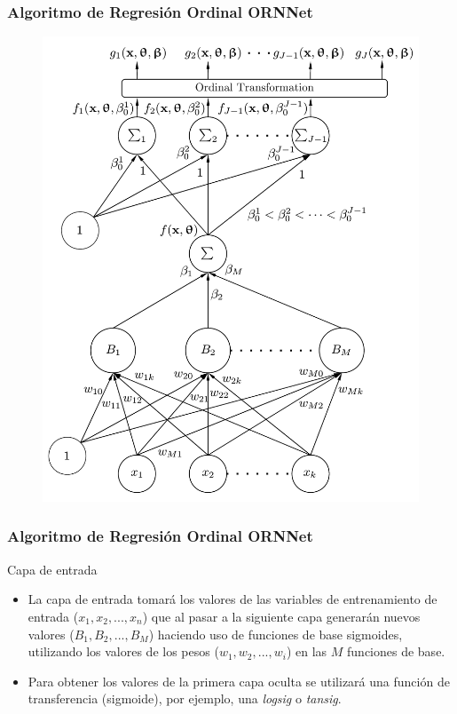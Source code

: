 \documentclass[compress,allowframebreaks]{beamer}
\begin{document}
			\begin{frame}
				\frametitle{\normalsize Algoritmo de Regresión Ordinal ORNNet}
				
				\begin{figure}[h]
					\centering
					\includegraphics[scale=0.3]{img/ORNNet.pdf}
				\end{figure}
			\end{frame}
				
			\begin{frame}
				\frametitle{\normalsize Algoritmo de Regresión Ordinal ORNNet}
				
				\begin{block}{Capa de entrada}
					\begin{itemize}\justifying
						\item La capa de entrada tomará los valores de las variables de entrenamiento de entrada ($x_1, x_2, ..., x_n$) que al pasar a la siguiente capa generarán nuevos valores ($B_1, B_2, ..., B_M$) haciendo uso de funciones de base sigmoides, utilizando los valores de los pesos ($w_1, w_2, ..., w_i$) en las $M$ funciones de base.
						\item Para obtener los valores de la primera capa oculta se utilizará una función de transferencia (sigmoide), por ejemplo, una \textit{logsig} o \textit{tansig}.
					\end{itemize}
				\end{block}
			\end{frame}
			
\end{document}
